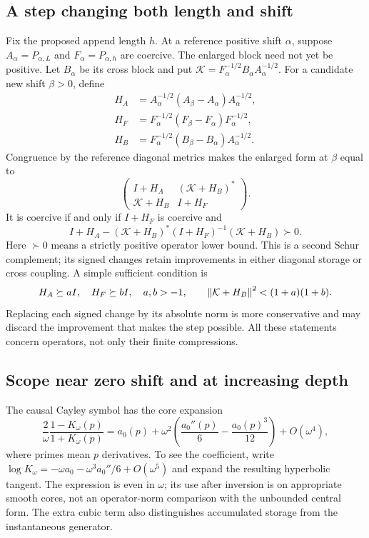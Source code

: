 \subsection{A step changing both length and shift}

Fix the proposed append length $h$. At a reference positive shift
$\alpha$, suppose $A_\alpha=P_{\alpha,L}$ and
$F_\alpha=P_{\alpha,h}$ are coercive. The enlarged block need
not yet be positive. Let $B_\alpha$ be its cross block and put
$\mathcal K=F_\alpha^{-1/2}B_\alpha A_\alpha^{-1/2}$.
For a candidate new shift $\beta>0$, define
\begin{align}
 H_A&=A_\alpha^{-1/2}(A_\beta-A_\alpha)A_\alpha^{-1/2},\\
 H_F&=F_\alpha^{-1/2}(F_\beta-F_\alpha)F_\alpha^{-1/2},\\
 H_B&=F_\alpha^{-1/2}(B_\beta-B_\alpha)A_\alpha^{-1/2}.
\end{align}
Congruence by the reference diagonal metrics makes the enlarged
form at $\beta$ equal to
\[
 \begin{pmatrix}
 I+H_A&(\mathcal K+H_B)^*\\
 \mathcal K+H_B&I+H_F
 \end{pmatrix}.
\]
It is coercive if and only if $I+H_F$ is coercive and
\begin{equation}\label{eq:si-joint}
 \boxed{I+H_A-(\mathcal K+H_B)^*(I+H_F)^{-1}
                     (\mathcal K+H_B)\succ0.}
\end{equation}
Here $\succ0$ means a strictly positive operator lower bound.
This is a second Schur complement; its signed changes retain
improvements in either diagonal storage or cross coupling.
A simple sufficient condition is
\[
 H_A\succeq aI,\quad H_F\succeq bI,\quad a,b>-1,\qquad
 \left\lVert\mathcal K+H_B\right\rVert^2<(1+a)(1+b).
\]
Replacing each signed change by its absolute norm is more
conservative and may discard the improvement that makes the step
possible. All these statements concern operators, not only their
finite compressions.

\subsection{Scope near zero shift and at increasing depth}

The causal Cayley symbol has the core expansion
\begin{equation}
 \frac2\omega\frac{1-K_\omega(p)}{1+K_\omega(p)}
 =a_0(p)+\omega^2\left(\frac{a_0''(p)}6
                         -\frac{a_0(p)^3}{12}\right)+O(\omega^4),
\end{equation}
where primes mean $p$ derivatives. To see the coefficient, write
$\log K_\omega=-\omega a_0-\omega^3a_0''/6+O(\omega^5)$
and expand the resulting hyperbolic tangent. The expression is
even in $\omega$; its use after inversion is on appropriate smooth
cores, not an operator-norm comparison with the unbounded central
form. The extra cubic term also distinguishes accumulated storage
from the instantaneous generator.

